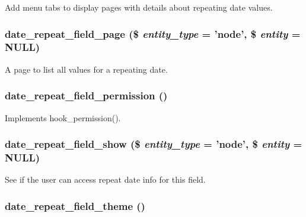 Add menu tabs to display pages with details about repeating date values. \hypertarget{date__repeat__field_8module_ac4e5602e2806df2d48d309694c20819c}{
\subsubsection[{date\_\-repeat\_\-field\_\-page}]{\setlength{\rightskip}{0pt plus 5cm}date\_\-repeat\_\-field\_\-page (\$ {\em entity\_\-type} = {\ttfamily 'node'}, \/  \$ {\em entity} = {\ttfamily NULL})}}
\label{date__repeat__field_8module_ac4e5602e2806df2d48d309694c20819c}
A page to list all values for a repeating date. \hypertarget{date__repeat__field_8module_ad4075999ffe895631c565c8ae295e742}{
\subsubsection[{date\_\-repeat\_\-field\_\-permission}]{\setlength{\rightskip}{0pt plus 5cm}date\_\-repeat\_\-field\_\-permission ()}}
\label{date__repeat__field_8module_ad4075999ffe895631c565c8ae295e742}
Implements hook\_\-permission(). \hypertarget{date__repeat__field_8module_adb20fc68338ed9fc0502c5b64dee6b69}{
\subsubsection[{date\_\-repeat\_\-field\_\-show}]{\setlength{\rightskip}{0pt plus 5cm}date\_\-repeat\_\-field\_\-show (\$ {\em entity\_\-type} = {\ttfamily 'node'}, \/  \$ {\em entity} = {\ttfamily NULL})}}
\label{date__repeat__field_8module_adb20fc68338ed9fc0502c5b64dee6b69}
See if the user can access repeat date info for this field. \hypertarget{date__repeat__field_8module_a7c686d7c8b75e0b277263535a9b6fbce}{
\subsubsection[{date\_\-repeat\_\-field\_\-theme}]{\setlength{\rightskip}{0pt plus 5cm}date\_\-repeat\_\-field\_\-theme ()}}
